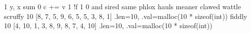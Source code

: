 \expandafter\def\csname cpp:swap\endcsname{1}
\expandafter\def\csname cpp:PARAM(x,y)\endcsname{y, x}
\expandafter\def\csname cpp:comp\endcsname{sum}
\expandafter\def\csname cpp:INIT\endcsname{0}
\expandafter\def\csname cpp:PROCESS(c,v)\endcsname{c += v}
\expandafter\def\csname cpp:NOT\endcsname{1}
\expandafter\def\csname cpp:COND(f,c,v)\endcsname{!f}
\expandafter\def\csname cpp:FALSE\endcsname{1}
\expandafter\def\csname cpp:TRUE\endcsname{0}
\expandafter\def\csname cpp:join\endcsname{and}
\expandafter\def\csname cpp:FORALLIN\endcsname{sired}
\expandafter\def\csname cpp:A\endcsname{same}
\expandafter\def\csname cpp:B\endcsname{phlox}
\expandafter\def\csname cpp:C\endcsname{hauls}
\expandafter\def\csname cpp:I\endcsname{meaner}
\expandafter\def\csname cpp:J\endcsname{clawed}
\expandafter\def\csname cpp:F\endcsname{wattle}
\expandafter\def\csname cpp:U\endcsname{scruffy}
\expandafter\def\csname cpp:TABU_LEN\endcsname{10}
\expandafter\def\csname cpp:TABU_VAL\endcsname{[8, 7, 5, 9, 6, 5, 5, 3, 8, 1]}
\expandafter\def\csname cpp:TABU\endcsname{{.len=10, .val=malloc(10 * sizeof(int))}}
\expandafter\def\csname cpp:V\endcsname{fiddly}
\expandafter\def\csname cpp:TABV_LEN\endcsname{10}
\expandafter\def\csname cpp:TABV_VAL\endcsname{[4, 10, 1, 3, 8, 9, 8, 7, 4, 10]}
\expandafter\def\csname cpp:TABV\endcsname{{.len=10, .val=malloc(10 * sizeof(int))}}

\def\C#1{\csname cpp:#1\endcsname}

